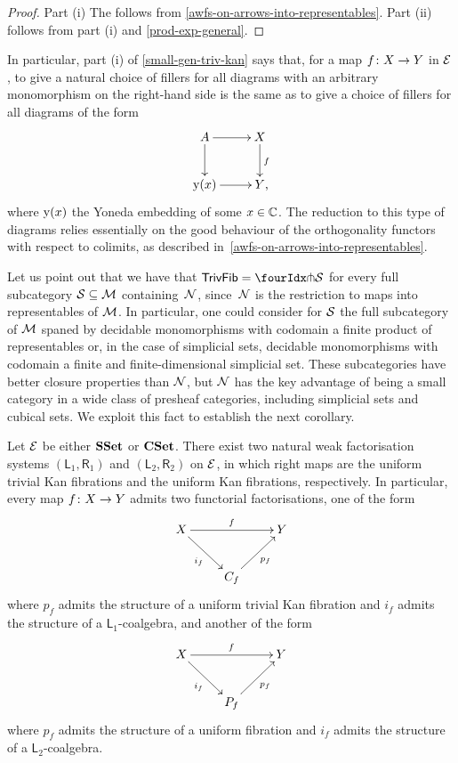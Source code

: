 \documentclass[reqno,10pt,a4paper,oneside,draft]{amsart}
\begin{document}
\begin{proof} Part (i) The follows from \cref{awfs-on-arrows-into-representables}.
Part (ii) follows from part (i) and \cref{prod-exp-general}.
\end{proof}

In particular, part (i) of \cref{small-gen-triv-kan} says that, for a map $f \co X \to Y$ in $\cal{E}$, to give a natural choice of fillers for all diagrams with an arbitrary monomorphism on the right-hand side is the same as to give a choice of fillers for all diagrams of the form
\[
\xymatrix{
A \ar[r] \ar[d] & X \ar[d]^f \\
\yon(x) \ar[r] & Y \rlap{,} }
\]
where $\yon(x)$ the Yoneda embedding of some $x \in \catC$.
The reduction to this type of diagrams relies essentially on the good behaviour of the orthogonality functors with respect to colimits, as described in~\cref{awfs-on-arrows-into-representables}.


\medskip

Let us point out that we have that $\mathsf{TrivFib} = \liftr{\cal{S}}$ for every full subcategory $\cal{S} \subseteq \cal{M}$ containing~$\cal{N}$, since~$\cal{N}$ is the restriction to maps into representables of $\cal{M}$.
In particular, one could consider for
$\cal{S}$ the full subcategory of $\cal{M}$ spaned by decidable monomorphisms with codomain a finite product of representables or, in the case of simplicial sets, decidable monomorphisms with codomain a finite and finite-dimensional simplicial set.
These subcategories have better closure properties than $\cal{N}$, but $\cal{N}$ has the key advantage of being a small category in a wide class of presheaf categories, including simplicial sets and cubical sets.
We exploit this fact to establish the next corollary.


\begin{corollary} \label{thm:sset-cset-nwfs} Let $\catE$ be either $\SSet$ or $\CSet$.
There exist two natural weak factorisation systems
$(\mathsf{L}_1, \mathsf{R}_1)$ and $(\mathsf{L}_2, \mathsf{R}_2)$ on $\catE$, in which right maps are the uniform trivial Kan fibrations and the uniform Kan fibrations, respectively.
In particular, every map $f \co X \to Y$ admits two functorial factorisations, one of the form
\[
\xymatrix{
  X \ar[rr]^f \ar[dr]_{i_f} & & Y \\
  & C_f \ar[ur]_{p_f}
}
\]
where $p_f$ admits the structure of a uniform trivial Kan fibration and $i_f$ admits the structure of a $\mathsf{L}_1$-coalgebra, and another of the form
\[
\xymatrix{
X \ar[rr]^f \ar[dr]_{i_f} & & Y \\
 & P_f \ar[ur]_{p_f} }
 \]
where $p_f$ admits the structure of a uniform fibration and $i_f$ admits the structure of a $\mathsf{L}_2$-coalgebra.
\end{corollary}
\end{document}
